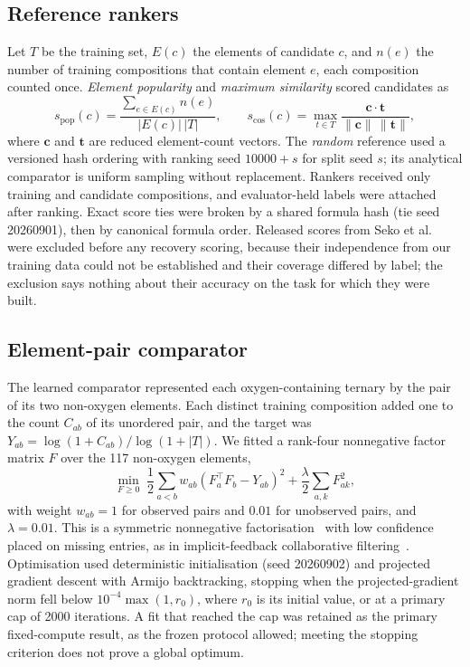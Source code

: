 \documentclass[11pt,a4paper]{article}
\begin{document}
\subsection{Reference rankers}
Let $T$ be the training set, $E(c)$ the elements of candidate $c$, and $n(e)$ the number of training compositions that contain element $e$, each composition counted once. \emph{Element popularity} and \emph{maximum similarity} scored candidates as
\begin{equation}
s_{\mathrm{pop}}(c)=\frac{\sum_{e\in E(c)} n(e)}{|E(c)|\,|T|},\qquad
s_{\mathrm{cos}}(c)=\max_{t\in T}\frac{\mathbf{c}\cdot\mathbf{t}}{\lVert\mathbf{c}\rVert\,\lVert\mathbf{t}\rVert},
\end{equation}
where $\mathbf{c}$ and $\mathbf{t}$ are reduced element-count vectors. The \emph{random} reference used a versioned hash ordering with ranking seed $10000+s$ for split seed $s$; its analytical comparator is uniform sampling without replacement. Rankers received only training and candidate compositions, and evaluator-held labels were attached after ranking. Exact score ties were broken by a shared formula hash (tie seed 20260901), then by canonical formula order. Released scores from Seko et al.~\citep{seko2018} were excluded before any recovery scoring, because their independence from our training data could not be established and their coverage differed by label; the exclusion says nothing about their accuracy on the task for which they were built.

\subsection{Element-pair comparator}
The learned comparator represented each oxygen-containing ternary by the pair of its two non-oxygen elements. Each distinct training composition added one to the count $C_{ab}$ of its unordered pair, and the target was $Y_{ab}=\log(1+C_{ab})/\log(1+|T|)$. We fitted a rank-four nonnegative factor matrix $F$ over the 117 non-oxygen elements,
\begin{equation}
\min_{F\ge 0}\;\frac12\sum_{a<b} w_{ab}\left(F_a^{\top}F_b-Y_{ab}\right)^2+\frac{\lambda}{2}\sum_{a,k}F_{ak}^2,
\end{equation}
with weight $w_{ab}=1$ for observed pairs and $0.01$ for unobserved pairs, and $\lambda=0.01$. This is a symmetric nonnegative factorisation~\citep{kuang2012} with low confidence placed on missing entries, as in implicit-feedback collaborative filtering~\citep{hu2008}. Optimisation used deterministic initialisation (seed 20260902) and projected gradient descent with Armijo backtracking, stopping when the projected-gradient norm fell below $10^{-4}\max(1,r_0)$, where $r_0$ is its initial value, or at a primary cap of \num{2000} iterations. A fit that reached the cap was retained as the primary fixed-compute result, as the frozen protocol allowed; meeting the stopping criterion does not prove a global optimum.
\end{document}
